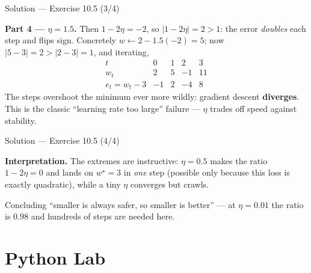 \documentclass[aspectratio=169,11pt]{beamer}
\begin{document}
\begin{frame}{Solution --- Exercise 10.5 (3/4)}
\begin{solutionbox}
  \textbf{Part 4 --- $\eta = 1.5$.} Then $1 - 2\eta = -2$, so
  $|1 - 2\eta| = 2 > 1$: the error \emph{doubles} each step and flips
  sign. Concretely $w \leftarrow 2 - 1.5(-2) = 5$; now
  $|5 - 3| = 2 > |2 - 3| = 1$, and iterating,
  \[
    \begin{array}{c|cccc}
      t & 0 & 1 & 2 & 3 \\ \hline
      w_t & 2 & 5 & -1 & 11 \\
      e_t = w_t - 3 & -1 & 2 & -4 & 8
    \end{array}
  \]
  The steps overshoot the minimum ever more wildly: gradient
  descent \textbf{diverges}. This is the classic ``learning rate too
  large'' failure --- $\eta$ trades off speed against stability.
\end{solutionbox}
\end{frame}

\begin{frame}{Solution --- Exercise 10.5 (4/4)}
\begin{solutionbox}
  \medskip
  \textbf{Interpretation.} The extremes are instructive: $\eta = 0.5$ makes
  the ratio $1 - 2\eta = 0$ and lands on $w^\star = 3$ in \emph{one} step
  (possible only because this loss is exactly quadratic), while a tiny
  $\eta$ converges but crawls.

\end{solutionbox}
\begin{mistake}
  Concluding ``smaller is always safer, so smaller is better'' --- at
  $\eta = 0.01$ the ratio is $0.98$ and hundreds of steps are needed here.
\end{mistake}
\end{frame}

\section{Python Lab}
\end{document}
